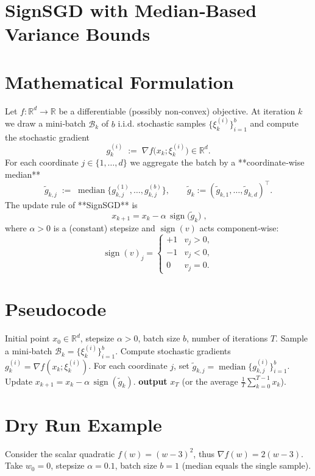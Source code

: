 \documentclass{article}
\newcommand{\sign}{\operatorname{sign}}
\newcommand{\R}{\mathbb{R}}
\begin{document}
\section*{SignSGD with Median‑Based Variance Bounds}

\section*{Mathematical Formulation}
Let $f:\R^{d}\to\R$ be a differentiable (possibly non‑convex) objective.  
At iteration $k$ we draw a mini‑batch $\mathcal{B}_{k}$ of $b$ i.i.d. stochastic samples
$\{\xi_{k}^{(i)}\}_{i=1}^{b}$ and compute the stochastic gradient
\[
g_{k}^{(i)}\;:=\;\nabla f\bigl(x_{k};\xi_{k}^{(i)}\bigr)\in\R^{d}.
\]
For each coordinate $j\in\{1,\dots,d\}$ we aggregate the batch by a **coordinate‑wise median**
\[
\tilde g_{k,j}\;:=\;\operatorname{median}\bigl\{g_{k,j}^{(1)},\dots,g_{k,j}^{(b)}\bigr\},
\qquad
\tilde g_{k}:=(\tilde g_{k,1},\dots,\tilde g_{k,d})^{\top}.
\]
The update rule of **SignSGD** is
\[
\boxed{ \; x_{k+1}=x_{k}-\alpha\,\sign\!\bigl(\tilde g_{k}\bigr) \;},
\tag{1}
\]
where $\alpha>0$ is a (constant) stepsize and $\sign(v)$ acts component‑wise:
\[
\sign(v)_{j}= 
\begin{cases}
+1 & v_{j}>0,\\[2mm]
-1 & v_{j}<0,\\[2mm]
0  & v_{j}=0 .
\end{cases}
\]

\section*{Pseudocode}
\begin{algorithm}[H]
\caption{SignSGD with Median Aggregation}
\begin{algorithmic}[1]
\Require Initial point $x_{0}\in\R^{d}$, stepsize $\alpha>0$, batch size $b$,
         number of iterations $T$.
    \State Sample a mini‑batch $\mathcal{B}_{k}=\{\xi_{k}^{(i)}\}_{i=1}^{b}$.
    \State Compute stochastic gradients $g_{k}^{(i)}=\nabla f(x_{k};\xi_{k}^{(i)})$.
    \State For each coordinate $j$, set $\tilde g_{k,j}= \operatorname{median}\{g_{k,j}^{(i)}\}_{i=1}^{b}$.
    \State Update $x_{k+1}=x_{k}-\alpha\,\sign(\tilde g_{k})$.
\EndFor
\State \textbf{output} $x_{T}$ (or the average $\frac1T\sum_{k=0}^{T-1}x_{k}$).
\end{algorithmic}
\end{algorithm}

\section*{Dry Run Example}
Consider the scalar quadratic $f(w)=(w-3)^{2}$, thus $\nabla f(w)=2(w-3)$.
Take $w_{0}=0$, stepsize $\alpha=0.1$, batch size $b=1$ (median equals the single sample).
\end{document}
